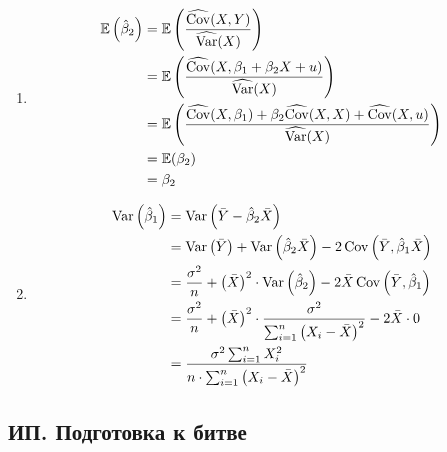 \documentclass[12pt, a4paper]{article}
\theoremstyle{definition}
\begin{document}
\begin{enumerate}
\item
\begin{align*}
\mathbb{E}\left(\hat{\beta}_2\right) &= \mathbb{E} \left(\frac{\widehat{\operatorname{Cov}}(X, Y)}{\widehat{\operatorname{Var}}(X)} \right) \\
&= \mathbb{E} \left(\frac{\widehat{\operatorname{Cov}}(X, \beta_1 + \beta_2 X + u)}{\widehat{\operatorname{Var}}(X)} \right)  \\
&= \mathbb{E} \left(\frac{\widehat{\operatorname{Cov}}(X, \beta_1) +  \beta_2\widehat{\operatorname{Cov}}(X, X) + \widehat{\operatorname{Cov}}(X, u)}{\widehat{\operatorname{Var}}(X)}  \right) \\
&= \mathbb{E}( \beta_2) \\
&= \beta_2
\end{align*}


\item
\begin{align*}
\operatorname{Var} \left(\hat{\beta}_1 \right) &= \operatorname{Var} \left(\bar{Y} - \hat{\beta}_2 \bar X \right) \\
&= \operatorname{Var} \left(\bar{Y} \right) + \operatorname{Var} \left( \hat{\beta}_2 \bar X \right) - 2 \operatorname{Cov}\left(\bar Y, \hat{\beta}_1 \bar X \right) \\
&= \frac{\sigma^2}{n} + \left(\bar X \right)^2 \cdot  \operatorname{Var} \left( \hat{\beta}_2 \right) - 2 \bar X \operatorname{Cov} \left(\bar{Y},  \hat{\beta}_1\right) \\
&= \frac{\sigma^2}{n}  + \left(\bar X \right)^2 \cdot \frac{\sigma^2}{\sum_{i=1}^n \left(X_i - \bar X \right)^2} - 2 \bar X \cdot 0 \\
&= \frac{\sigma^2 \sum_{i=1}^n X_i^2}{n \cdot \sum_{i=1}^n \left(X_i - \bar X \right)^2}
\end{align*}

\end{enumerate}



\subsection{ИП. Подготовка к битве}
\end{document}
